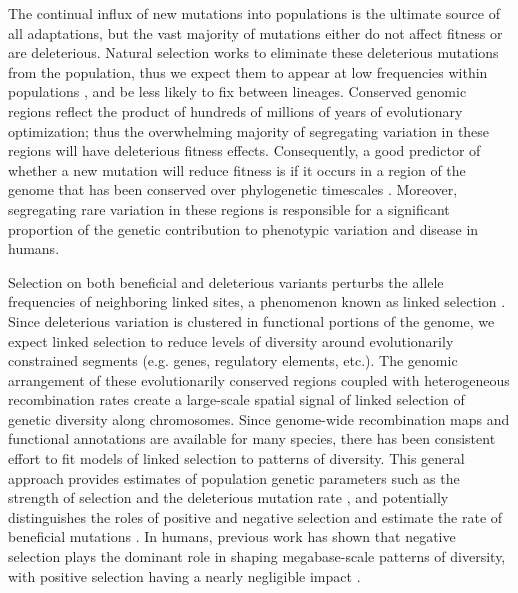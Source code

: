 \documentclass[11pt]{article}
\begin{document}
The continual influx of new mutations into populations is the ultimate source of all adaptations, but the vast majority of mutations either do not affect fitness or are deleterious. Natural selection works to eliminate these deleterious mutations from the population, thus we expect them to appear at low frequencies within populations \parencite{Haldane1927-ga}, and be less likely to fix between lineages. Conserved genomic regions reflect the product of hundreds of millions of years of evolutionary optimization; thus the overwhelming majority of segregating variation in these regions will have deleterious fitness effects. Consequently, a good predictor of whether a new mutation will reduce fitness is if it occurs in a region of the genome that has been conserved over phylogenetic timescales \parencite{Siepel2005-wh,Margulies2003-sn}. Moreover, segregating rare variation in these regions is responsible for a significant proportion of the genetic contribution to phenotypic variation and disease in humans\parencite{Zeng2018-ci,Lek2016-cb,Karczewski2020-ky,Tennessen2012-ge}.

Selection on both beneficial and deleterious variants perturbs the allele frequencies of neighboring linked sites, a phenomenon known as linked selection
\parencite{Nordborg1996-nq,Maynard_Smith1974-zr,Barton1998-aj,Charlesworth1993-gb,Kaplan1989-sc}.
Since deleterious variation is clustered in functional portions of the genome,
we expect linked selection to reduce levels of diversity around evolutionarily constrained
segments (e.g. genes, regulatory elements, etc.). The genomic arrangement of
these evolutionarily conserved regions coupled with heterogeneous recombination rates create a
large-scale spatial signal of linked selection of genetic diversity along chromosomes. Since genome-wide recombination maps and functional annotations are available for many species, there has been consistent effort to fit models of linked selection to patterns of diversity. This general approach provides estimates of population genetic
parameters such as the strength of selection and the deleterious mutation rate
\parencite{Hudson1995-pt,McVicker2009-ax}, and potentially distinguishes the roles of positive and negative selection and estimate the rate of
beneficial mutations \parencite{Elyashiv2016-vt,Murphy2022-sj}. In humans,
previous work has shown that negative selection plays the dominant role in
shaping megabase-scale patterns of diversity, with positive selection having a
nearly negligible impact \parencite{Murphy2022-sj}.
\end{document}
